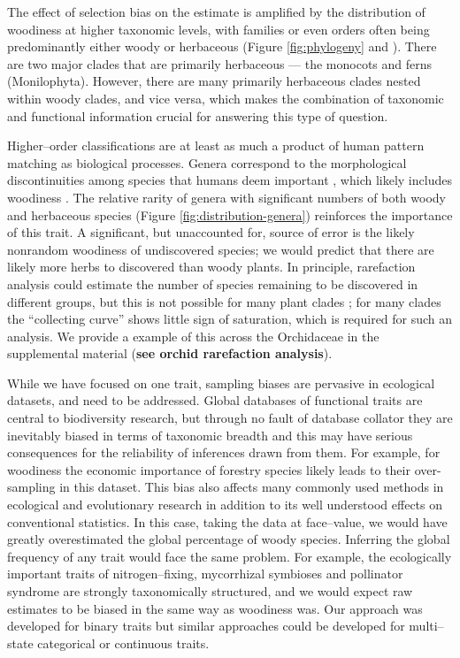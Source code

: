 \documentclass[a4paper,12pt]{article}
\begin{document}
The effect of selection bias on the estimate is amplified by the distribution of woodiness at higher
taxonomic levels, with families or even orders often being
predominantly either woody or herbaceous (Figure \ref{fig:phylogeny} and
\citealt{sinnott1915evolution}).  There are two major clades that are
primarily herbaceous --- the monocots and ferns
(Monilophyta). However, there are many primarily herbaceous clades
nested within woody clades, and vice versa, which makes the
combination of taxonomic and functional information crucial for
answering this type of question.  

Higher--order classifications are at least as much a product of human
pattern matching as biological processes.  Genera correspond to the
morphological discontinuities among species that humans deem important
\citep{scotland2004significance}, which likely includes woodiness
\citep[e.g.,][]{Hutchinson}.  The relative rarity of genera with
significant numbers of both woody and herbaceous species (Figure
\ref{fig:distribution-genera}) reinforces the importance of this
trait.  A significant, but unaccounted for, source of error is the likely
nonrandom woodiness of undiscovered species; we would predict that
there are likely more herbs to discovered than woody plants.  In principle,
rarefaction analysis could estimate the number of species remaining to
be discovered in different groups, but this is not possible for many
plant clades \citep{costello2011}; for many clades the ``collecting curve'' 
shows little sign of saturation, which is required for such an analysis.
We provide a example of this across the Orchidaceae in the supplemental material
(\textbf{see orchid rarefaction analysis}).

While we have focused on one trait, sampling biases are pervasive in ecological datasets, and need to be addressed.
Global databases of functional traits
\citep[e.g., TRY;][]{kattge2011try} are central to biodiversity
research, but through no fault of database collator they are inevitably biased in terms of taxonomic breadth
and this may have serious consequences for the reliability of
inferences drawn from them.
For example, for woodiness the economic importance of forestry species
likely leads to their
over-sampling in this dataset.
This bias also affects many commonly used methods in ecological and evolutionary research \citep[e.g.,][]{ackerly2000taxon,nakagawa2008missing,pennell2013integrative, Pakeman2013} in addition to its well understood effects on conventional statistics.  In this case, taking the data at face--value, 
we would have greatly overestimated
the global percentage of woody species.  Inferring the global
frequency of any trait would face the same problem.  For
example, the ecologically important traits of nitrogen--fixing,
mycorrhizal symbioses and pollinator syndrome are strongly
taxonomically structured, and we would expect raw estimates to be
biased in the same way as woodiness was.  Our approach was developed
for binary traits
but similar approaches could be developed for multi--state categorical or continuous traits.
\end{document}

